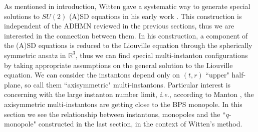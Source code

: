 \documentclass[a4paper,10pt]{article}
\newcommand{\sutwo}{$SU(2)$ }
\newcommand{\ie}{\textit{i.e.}}
\begin{document}
As mentioned in introduction, Witten gave a systematic way to generate special  solutions to \sutwo (A)SD equations in his early work \cite{W}.
This construction is independent of the ADHMN reviewed in the previous sections, thus we are interested in the connection between them.
In his construction, a component of the (A)SD equations is reduced to the Liouville equation through the spherically symmetric ansatz in $\mathbb{R}^3$, thus we can find special multi-instanton configurations by taking appropriate assumptions on the general solution to the Liouville equation.
We can consider the instantons depend only on $(t,r)$ ``upper" half-plane, so call them ``axisymmetric" multi-instantons.
Particular interest is concerning with the large instanton number limit, \ie, according to Manton \cite{Mant}, the axisymmetric multi-instantons are getting close to the BPS monopole.
In this section we see the relationship between instantons, monopoles and the ``$q$-monopole" constructed in the last section, in the context of Witten's method.
\end{document}
